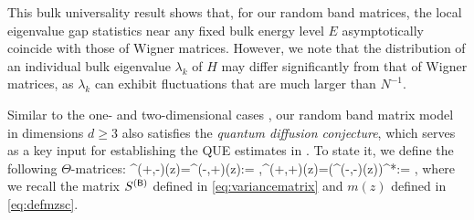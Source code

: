 This bulk universality result shows that, for our random band matrices, the local eigenvalue gap statistics near any fixed bulk energy level $E$ asymptotically coincide with those of Wigner matrices. However, we note that the distribution of an individual bulk eigenvalue $\lambda_k$ of $H$ may differ significantly from that of Wigner matrices, as $\lambda_k$ can exhibit fluctuations that are much larger than $N^{-1}$. 


 



Similar to the one- and two-dimensional cases \cite{YY_25,DYYY25,erdHos2025zigzag,RBSO1D}, our random band matrix model in dimensions $d\ge 3$ also satisfies the \emph{quantum diffusion conjecture}, which serves as a key input for establishing the QUE estimates in .
To state it, we define the following $\Theta$-matrices:
\be \label{def:Theta}
\Theta^{(+,-)}(z)=\Theta^{(-,+)}(z):=  ,\quad \Theta^{(+,+)}(z)=(\Theta^{(-,-)}(z))^*:=  , 
\ee
where we recall the matrix $S^{({\mathsf{B}})}$ defined in \eqref{eq:variancematrix} and $m(z)$ defined in \eqref{eq:defmzsc}. 



